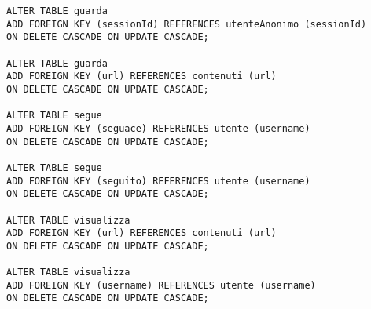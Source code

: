 \begin{lstlisting}
ALTER TABLE guarda
ADD FOREIGN KEY (sessionId) REFERENCES utenteAnonimo (sessionId) 
ON DELETE CASCADE ON UPDATE CASCADE;

ALTER TABLE guarda
ADD FOREIGN KEY (url) REFERENCES contenuti (url) 
ON DELETE CASCADE ON UPDATE CASCADE;

ALTER TABLE segue
ADD FOREIGN KEY (seguace) REFERENCES utente (username) 
ON DELETE CASCADE ON UPDATE CASCADE;

ALTER TABLE segue
ADD FOREIGN KEY (seguito) REFERENCES utente (username) 
ON DELETE CASCADE ON UPDATE CASCADE;

ALTER TABLE visualizza
ADD FOREIGN KEY (url) REFERENCES contenuti (url) 
ON DELETE CASCADE ON UPDATE CASCADE;

ALTER TABLE visualizza
ADD FOREIGN KEY (username) REFERENCES utente (username) 
ON DELETE CASCADE ON UPDATE CASCADE;
\end{lstlisting}












